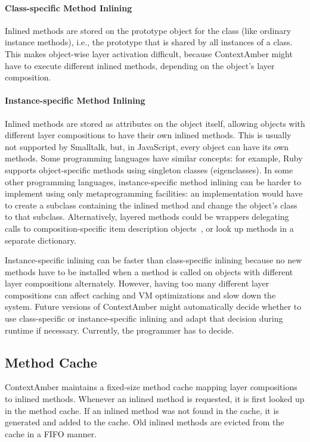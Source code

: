\documentclass{sig-alternate}
\begin{document}
\paragraph{Class-specific Method Inlining}
Inlined methods are stored on the prototype object for the class (like ordinary instance methods), i.e., the prototype that is shared by all instances of a class. This makes object-wise layer activation difficult, because ContextAmber might have to execute different inlined methods, depending on the object's layer composition.


\paragraph{Instance-specific Method Inlining}
Inlined methods are stored as attributes on the object itself, allowing objects with different layer compositions to have their own inlined methods. This is usually not supported by Smalltalk, but, in JavaScript, every object can have its own methods. Some programming languages have similar concepts: for example, Ruby supports object-specific methods using singleton classes (eigenclasses). In some other programming languages, instance-specific method inlining can be harder to
implement using only metaprogramming facilities: an implementation would have to create a subclass containing the inlined method and change the object's class to that subclass. Alternatively, layered methods could be wrappers delegating calls to composition-specific item description objects~\cite{Coad:1992:OP:130994.131006}, or look up methods in a separate dictionary.

Instance-specific inlining can be faster than class-specific inlining because no new methods have to be installed when a method is called on objects with different layer compositions alternately. However, having too many different layer compositions can affect caching and VM optimizations and slow down the system. Future versions of ContextAmber might automatically decide whether to use class-specific or instance-specific inlining and adapt that decision during runtime if necessary. Currently, the programmer has to decide.

\subsection{Method Cache}
ContextAmber maintains a fixed-size method cache mapping layer compositions to inlined methods. Whenever an inlined method is requested, it is first looked up in the method cache. If an inlined method was not found in the cache, it is generated and added to the cache. Old inlined methods are evicted from the cache in a FIFO manner. 
\end{document}
